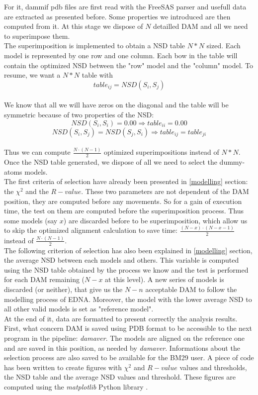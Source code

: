 \documentclass[a4paper, 11pt]{report}
\begin{document}
For it, dammif pdb files are first read with the FreeSAS parser and 
usefull data are extracted as presented before. 
Some properties we introduced are then computed from it. 
At this stage we dispose of $N$ detailled DAM and all we need to 
superimpose them.\\
The superimposition is implemented to obtain a NSD table $N*N$ sized. 
Each model is represented by one row and one column. 
Each bow in the table will contain the optimized NSD between the "row" 
model and the "column" model. 
To resume, we want a $N*N$ table with 
\[
table_{ij}=NSD(S_{i},S_{j})
\]\\ 
We know that all we will have zeros on the diagonal and the table will 
be symmetric because of two properties of the NSD:
\[
NSD(S_{i},S_{i})=0.00 \Rightarrow table_{ii}=0.00
\]
\[
NSD(S_{i},S_{j}) = NSD(S_{j},S_{i}) \Rightarrow table_{ij}=table_{ji}
\]\\
Thus we can compute $\frac{N \cdot (N-1)}{2}$ optimized 
superimpositions instead of $N*N$.\\

Once the NSD table generated, we dispose of all we need to select the 
dummy-atoms models.\\
The first criteria of selection have already been presented in 
\ref{modelling} section: the $\chi^2$ and the $R-value$. 
These two parameters are not dependent of the DAM position, they are 
computed before any movements. 
So for a gain of execution time, the test on them are computed before 
the superimposition process. 
Thus some models (say $x$) are discarded before to be superimposition, 
which allow us to skip the optimized alignment calculation to save 
time: $\frac{(N-x) \cdot (N-x-1)}{2}$ instead of 
$\frac{N \cdot (N-1)}{2}$.\\
The following criterion of selection has also been explained in 
\ref{modelling} section, the average NSD between each models and 
others. 
This variable is computed using the NSD table obtained by the process 
we know and the test is performed for each DAM remaining ($N-x$ at 
this level). 
A new series of models is discarded (or neither), that give us the 
$N-n$ acceptable DAM to follow the modelling process of EDNA. 
Moreover, the model with the lower average NSD to all other valid 
models is set as "reference model".\\

At the end of it, data are formatted to present correctly the analysis 
results. 
First, what concern DAM is saved using PDB format to be accessible to 
the next program in the pipeline: \textit{damaver}. 
The models are aligned on the reference one and are saved in this 
position, as needed by \textit{damaver}. 
Informations about the selection process are also saved to be 
available for the BM29 user. 
A piece of code has been written to create figures with $\chi^2$ and 
$R-value$ values and thresholds, the NSD table and the average NSD 
values and threshold. 
These figures are computed using the \textit{matplotlib} Python 
library \cite{matplotlib}.\\
\end{document}
